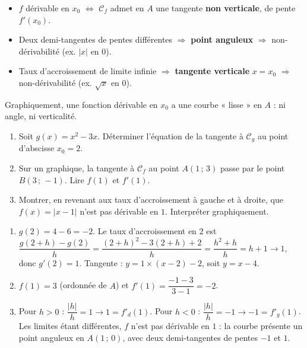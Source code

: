 \documentclass[11pt]{article}
\begin{document}
\begin{aretenir}
\begin{itemize}
\item $f$ dérivable en $x_0$ $\Longleftrightarrow$ $\mathcal{C}_f$ admet en $A$ une tangente \textbf{non verticale}, de pente $f'(x_0)$.
\item Deux demi-tangentes de pentes différentes $\Rightarrow$ \textbf{point anguleux} $\Rightarrow$ non-dérivabilité (ex. $|x|$ en $0$).
\item Taux d'accroissement de limite infinie $\Rightarrow$ \textbf{tangente verticale} $x = x_0$ $\Rightarrow$ non-dérivabilité (ex. $\sqrt{x}$ en $0$).
\end{itemize}
Graphiquement, une fonction dérivable en $x_0$ a une courbe « lisse » en $A$ : ni angle, ni verticalité.
\end{aretenir}

\begin{exercice}
\begin{enumerate}
\item Soit $g(x) = x^2 - 3x$. Déterminer l'équation de la tangente à $\mathcal{C}_g$ au point d'abscisse $x_0 = 2$.
\item Sur un graphique, la tangente à $\mathcal{C}_f$ au point $A(1\,;\,3)$ passe par le point $B(3\,;\,-1)$. Lire $f(1)$ et $f'(1)$.
\item Montrer, en revenant aux taux d'accroissement à gauche et à droite, que $f(x) = |x - 1|$ n'est pas dérivable en $1$. Interpréter graphiquement.
\end{enumerate}
\end{exercice}

\begin{corrige}[Exercice]
\begin{enumerate}
\item $g(2) = 4 - 6 = -2$. Le taux d'accroissement en $2$ est $\dfrac{g(2+h)-g(2)}{h} = \dfrac{(2+h)^2 - 3(2+h) + 2}{h} = \dfrac{h^2 + h}{h} = h + 1 \to 1$, donc $g'(2) = 1$. Tangente : $y = 1 \times (x - 2) - 2$, soit $y = x - 4$.
\item $f(1) = 3$ (ordonnée de $A$) et $f'(1) = \dfrac{-1 - 3}{3 - 1} = -2$.
\item Pour $h > 0$ : $\dfrac{|h|}{h} = 1 \to 1 = f'_d(1)$. Pour $h < 0$ : $\dfrac{|h|}{h} = -1 \to -1 = f'_g(1)$. Les limites étant différentes, $f$ n'est pas dérivable en $1$ : la courbe présente un point anguleux en $A(1\,;\,0)$, avec deux demi-tangentes de pentes $-1$ et $1$.
\end{enumerate}
\end{corrige}
\end{document}
